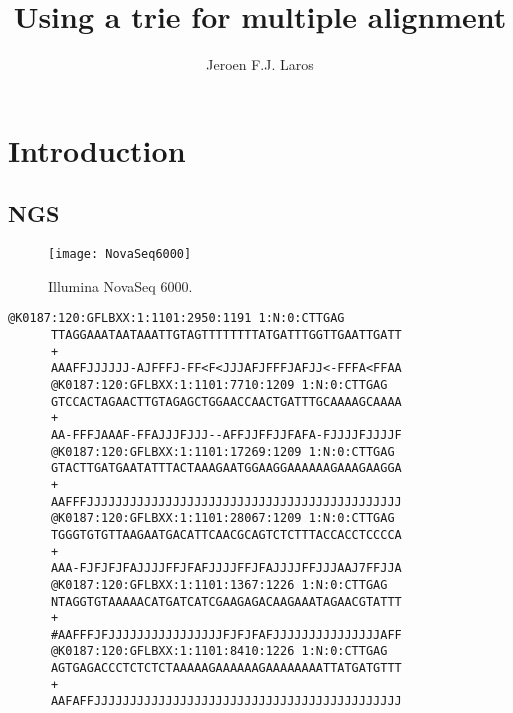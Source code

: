 \documentclass[slidestop]{beamer}
\author{Jeroen F.J. Laros}
\title{Using a trie for multiple alignment}
\begin{document}



\section{Introduction}
\makeTableOfContents

\subsection{NGS}
\begin{pframe}
  \begin{minipage}[t]{0.47\textwidth}\begin{figure}[]
    \begin{center}
      \texttt{[image: NovaSeq6000]}
    \end{center}
    \caption{Illumina NovaSeq 6000.}
  \end{figure}
  \end{minipage}
  \hfill
  \begin{minipage}[t]{0.47\textwidth}
    \begin{Verbatim}[fontsize=\tiny]
      @K0187:120:GFLBXX:1:1101:2950:1191 1:N:0:CTTGAG
      TTAGGAAATAATAAATTGTAGTTTTTTTTATGATTTGGTTGAATTGATT
      +
      AAAFFJJJJJJ-AJFFFJ-FF<F<JJJAFJFFFJAFJJ<-FFFA<FFAA
      @K0187:120:GFLBXX:1:1101:7710:1209 1:N:0:CTTGAG
      GTCCACTAGAACTTGTAGAGCTGGAACCAACTGATTTGCAAAAGCAAAA
      +
      AA-FFFJAAAF-FFAJJJFJJJ--AFFJJFFJJFAFA-FJJJJFJJJJF
      @K0187:120:GFLBXX:1:1101:17269:1209 1:N:0:CTTGAG
      GTACTTGATGAATATTTACTAAAGAATGGAAGGAAAAAAGAAAGAAGGA
      +
      AAFFFJJJJJJJJJJJJJJJJJJJJJJJJJJJJJJJJJJJJJJJJJJJJ
      @K0187:120:GFLBXX:1:1101:28067:1209 1:N:0:CTTGAG
      TGGGTGTGTTAAGAATGACATTCAACGCAGTCTCTTTACCACCTCCCCA
      +
      AAA-FJFJFJFAJJJJFFJFAFJJJJFFJFAJJJJFFJJJAAJ7FFJJA
      @K0187:120:GFLBXX:1:1101:1367:1226 1:N:0:CTTGAG
      NTAGGTGTAAAAACATGATCATCGAAGAGACAAGAAATAGAACGTATTT
      +
      #AAFFFJFJJJJJJJJJJJJJJJJFJFJFAFJJJJJJJJJJJJJJJAFF
      @K0187:120:GFLBXX:1:1101:8410:1226 1:N:0:CTTGAG
      AGTGAGACCCTCTCTCTAAAAAGAAAAAAGAAAAAAAATTATGATGTTT
      +
      AAFAFFJJJJJJJJJJJJJJJJJJJJJJJJJJJJJJJJJJJJJJJJJJJ
    \end{Verbatim}
  \end{minipage}
\end{pframe}
\end{document}
